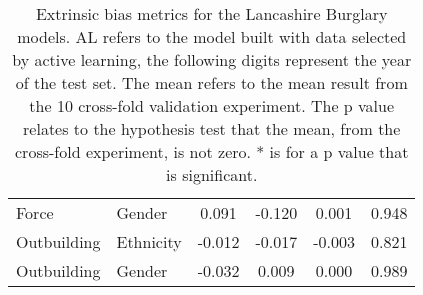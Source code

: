 \begin{table}[]
\begin{tabular}{@{}llcccc@{}}
Force         & Gender    & 0.091                            & -0.120                           & 0.001                    & 0.948                       \\
Outbuilding   & Ethnicity & -0.012                           & -0.017                           & -0.003                   & 0.821                       \\
Outbuilding   & Gender    & -0.032                           & 0.009                            & 0.000                    & 0.989                       \\ \bottomrule
\end{tabular}
\caption[Bias Metrics. PF2 data. All models.]{\label{tab:lancs_bias} Extrinsic bias metrics for the Lancashire Burglary models. AL refers to the model built with data selected by active learning, the following digits represent the year of the test set. The mean refers to the mean result from the 10 cross-fold validation experiment. The p value relates to the hypothesis test that the mean, from the cross-fold experiment, is not zero. * is for a p value that is significant.}
\end{table}